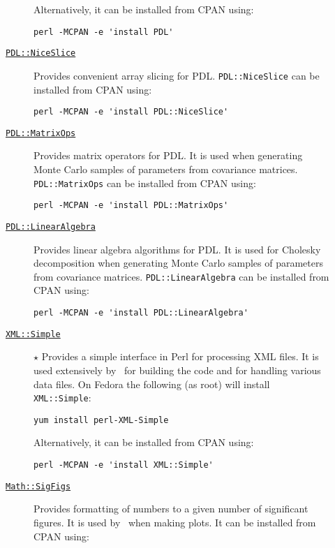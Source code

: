 \begin{description}
\begin{description}
Alternatively, it can be installed from CPAN using:
\begin{verbatim}
perl -MCPAN -e 'install PDL'
\end{verbatim}
  \item [\href{http://search.cpan.org/dist/PDL-NiceSlice/NiceSlice.pm}{{\tt PDL::NiceSlice}}] Provides convenient array slicing for PDL. {\tt PDL::NiceSlice} can be installed from CPAN using:
\begin{verbatim}
perl -MCPAN -e 'install PDL::NiceSlice'
\end{verbatim}
  \item [\href{http://search.cpan.org/~chm/PDL-2.4.7/Basic/MatrixOps/matrixops.pd}{{\tt PDL::MatrixOps}}] Provides matrix operators for PDL. It is used when generating Monte Carlo samples of parameters from covariance matrices. {\tt PDL::MatrixOps} can be installed from CPAN using:
\begin{verbatim}
perl -MCPAN -e 'install PDL::MatrixOps'
\end{verbatim}
  \item [\href{http://search.cpan.org/~ellipse/PDL-LinearAlgebra-0.06/LinearAlgebra.pm}{{\tt PDL::LinearAlgebra}}] Provides linear algebra algorithms for PDL. It is used for Cholesky decomposition when generating Monte Carlo samples of parameters from covariance matrices. {\tt PDL::LinearAlgebra} can be installed from CPAN using:
\begin{verbatim}
perl -MCPAN -e 'install PDL::LinearAlgebra'
\end{verbatim}
  \item [\href{http://search.cpan.org/~grantm/XML-Simple-2.18/lib/XML/Simple.pm}{{\tt XML::Simple}}] $\star$ Provides a simple interface in Perl for processing XML files. It is used extensively by \glc\ for building the code and for handling various data files. On Fedora the following (as root) will install {\tt XML::Simple}:
\begin{verbatim}
yum install perl-XML-Simple
\end{verbatim}
Alternatively, it can be installed from CPAN using:
\begin{verbatim}
perl -MCPAN -e 'install XML::Simple'
\end{verbatim}
  \item [\href{http://search.cpan.org/~sbeck/Math-SigFigs-1.09/lib/Math/SigFigs.pod}{{\tt Math::SigFigs}}] Provides formatting of numbers to a given number of significant figures. It is used by \glc\ when making plots. It can be installed from CPAN using:
\begin{verbatim}

\end{verbatim}
\end{description}
\end{description}
